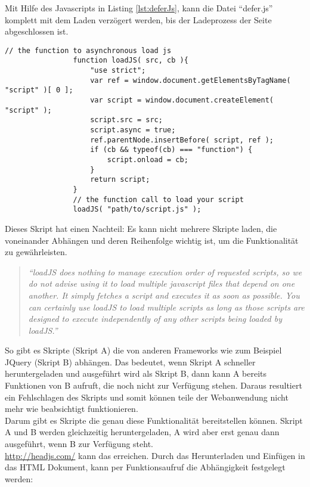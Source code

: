 				Mit Hilfe des Javascripts in Listing \ref{lst:deferJs}, kann die Datei "`defer.js"' komplett mit dem Laden verzögert werden, bis der Ladeprozess der Seite abgeschlossen ist.
				\begin{lstlisting}[captionpos=b, caption=Javascript nach \autocite{deferJS}, label=lst:deferJs]
				// the function to asynchronous load js
				function loadJS( src, cb ){
					"use strict";
					var ref = window.document.getElementsByTagName( "script" )[ 0 ];
					var script = window.document.createElement( "script" );
					script.src = src;
					script.async = true;
					ref.parentNode.insertBefore( script, ref );
					if (cb && typeof(cb) === "function") {
						script.onload = cb;
					}
					return script;
				}
				// the function call to load your script
				loadJS( "path/to/script.js" );
				\end{lstlisting}

				Dieses Skript hat einen Nachteil: Es kann nicht mehrere Skripte laden, die voneinander Abhängen und deren Reihenfolge wichtig ist, um die Funktionalität zu gewährleisten. 

				\begin{quote}
					\textit{"`loadJS does nothing to manage execution order of requested scripts, so we do not advise using it to load multiple javascript files that depend on one another. It simply fetches a script and executes it as soon as possible. You can certainly use loadJS to load multiple scripts as long as those scripts are designed to execute independently of any other scripts being loaded by loadJS."'\autocite{deferJS}}
				\end{quote}

				So gibt es Skripte (Skript A) die von anderen Frameworks wie zum Beispiel JQuery (Skript B) abhängen. Das bedeutet, wenn Skript A schneller heruntergeladen und ausgeführt wird als Skript B, dann kann A bereits Funktionen von B aufruft, die noch nicht zur Verfügung stehen. Daraus resultiert ein Fehlschlagen des Skripts und somit können teile der Webanwendung nicht mehr wie beabsichtigt funktionieren.\\

				Darum gibt es Skripte die genau diese Funktionalität bereitstellen können. Skript A und B werden gleichzeitig heruntergeladen, A wird aber erst genau dann ausgeführt, wenn B zur Verfügung steht.\\

				\url{http://headjs.com/} kann das erreichen. Durch das Herunterladen und Einfügen in das HTML Dokument, kann per Funktionsaufruf die Abhängigkeit festgelegt werden:

